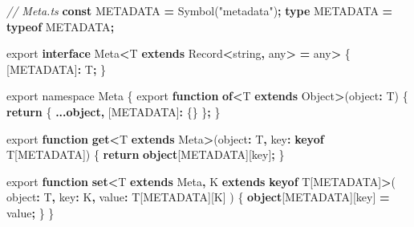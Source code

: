\documentclass[
]{book}
\newenvironment{Shaded}{\begin{snugshade}}{\end{snugshade}}
\newcommand{\BuiltInTok}[1]{#1}
\newcommand{\CommentTok}[1]{\textcolor[rgb]{0.56,0.35,0.01}{\textit{#1}}}
\newcommand{\ControlFlowTok}[1]{\textcolor[rgb]{0.13,0.29,0.53}{\textbf{#1}}}
\newcommand{\DataTypeTok}[1]{\textcolor[rgb]{0.13,0.29,0.53}{#1}}
\newcommand{\ImportTok}[1]{#1}
\newcommand{\KeywordTok}[1]{\textcolor[rgb]{0.13,0.29,0.53}{\textbf{#1}}}
\newcommand{\NormalTok}[1]{#1}
\newcommand{\OperatorTok}[1]{\textcolor[rgb]{0.81,0.36,0.00}{\textbf{#1}}}
\newcommand{\StringTok}[1]{\textcolor[rgb]{0.31,0.60,0.02}{#1}}
\theoremstyle{definition}
\theoremstyle{definition}
\theoremstyle{definition}
\theoremstyle{definition}
\theoremstyle{remark}
\begin{document}
\begin{Shaded}
\begin{Highlighting}[]
\CommentTok{// Meta.ts}
\KeywordTok{const}\NormalTok{ METADATA }\OperatorTok{=} \BuiltInTok{Symbol}\NormalTok{(}\StringTok{"metadata"}\NormalTok{)}\OperatorTok{;}
\KeywordTok{type}\NormalTok{ METADATA }\OperatorTok{=} \KeywordTok{typeof}\NormalTok{ METADATA}\OperatorTok{;}

\ImportTok{export} \KeywordTok{interface}\NormalTok{ Meta}\OperatorTok{\textless{}}\NormalTok{T }\KeywordTok{extends} \BuiltInTok{Record}\OperatorTok{\textless{}}\DataTypeTok{string}\OperatorTok{,} \DataTypeTok{any}\OperatorTok{\textgreater{}} \OperatorTok{=} \DataTypeTok{any}\OperatorTok{\textgreater{}}\NormalTok{ \{}
\NormalTok{  [METADATA]}\OperatorTok{:}\NormalTok{ T}\OperatorTok{;}
\NormalTok{\}}

\ImportTok{export} \ImportTok{namespace} \DataTypeTok{Meta}\NormalTok{ \{}
  \ImportTok{export} \KeywordTok{function} \KeywordTok{of}\OperatorTok{\textless{}}\NormalTok{T }\KeywordTok{extends} \BuiltInTok{Object}\OperatorTok{\textgreater{}}\NormalTok{(object}\OperatorTok{:}\NormalTok{ T) \{}
    \ControlFlowTok{return}\NormalTok{ \{ }\OperatorTok{...}\KeywordTok{object}\OperatorTok{,}\NormalTok{ [METADATA]}\OperatorTok{:}\NormalTok{ \{\} \}}\OperatorTok{;}
\NormalTok{  \}}

  \ImportTok{export} \KeywordTok{function} \KeywordTok{get}\OperatorTok{\textless{}}\NormalTok{T }\KeywordTok{extends}\NormalTok{ Meta}\OperatorTok{\textgreater{}}\NormalTok{(object}\OperatorTok{:}\NormalTok{ T}\OperatorTok{,}\NormalTok{ key}\OperatorTok{:} \KeywordTok{keyof}\NormalTok{ T[METADATA]) \{}
    \ControlFlowTok{return} \KeywordTok{object}\NormalTok{[METADATA][key]}\OperatorTok{;}
\NormalTok{  \}}

  \ImportTok{export} \KeywordTok{function} \KeywordTok{set}\OperatorTok{\textless{}}\NormalTok{T }\KeywordTok{extends}\NormalTok{ Meta}\OperatorTok{,}\NormalTok{ K }\KeywordTok{extends} \KeywordTok{keyof}\NormalTok{ T[METADATA]}\OperatorTok{\textgreater{}}\NormalTok{(}
\NormalTok{    object}\OperatorTok{:}\NormalTok{ T}\OperatorTok{,}
\NormalTok{    key}\OperatorTok{:}\NormalTok{ K}\OperatorTok{,}
\NormalTok{    value}\OperatorTok{:}\NormalTok{ T[METADATA][K]}
\NormalTok{  ) \{}
    \KeywordTok{object}\NormalTok{[METADATA][key] }\OperatorTok{=}\NormalTok{ value}\OperatorTok{;}
\NormalTok{  \}}
\NormalTok{\}}
\end{Highlighting}
\end{Shaded}
\end{document}
